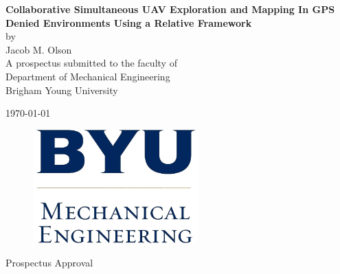 \documentclass[12pt, letterpaper]{article}
\begin{document}
\begin{titlepage}

\begin{center}

\vspace*{\fill}

\vspace{0.5in}

{ \LARGE \bfseries Collaborative Simultaneous UAV Exploration and Mapping In GPS Denied Environments Using a Relative Framework}\\[.25in]

\large
by\\[.25 in]
Jacob M. Olson\\[1in]

A prospectus submitted to the faculty of\\
Department of Mechanical Engineering\\
Brigham Young University

\vspace{1in}

\today

\vspace*{\fill}

\end{center}

\end{titlepage}

\thispagestyle{empty}

\begin{center}
\vspace*{\fill}

\begin{figure}[htbp] %
   \centering
   \includegraphics[width=2.5in]{byume_logo_clear.jpg} 
\end{figure}

\vspace{0.5in}

\Large{Prospectus Approval}\\[0.5in]

\end{center}
\end{document}
